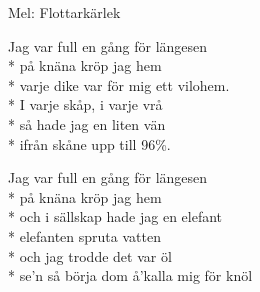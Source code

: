\begin{SongText}[Fyllerian]
    \begin{SongInfo}
        Mel: Flottarkärlek
    \end{SongInfo}
    \begin{SongVerse}
        Jag var full en gång för längesen\\*%
        på knäna kröp jag hem\\*%
        varje dike var för mig ett vilohem.\\*%
        I varje skåp, i varje vrå\\*%
        så hade jag en liten vän\\*%
        ifrån skåne upp till 96\%.
    \end{SongVerse}
    \begin{SongVerse}
        Jag var full en gång för längesen\\*%
        på knäna kröp jag hem\\*%
        och i sällskap hade jag en elefant\\*%
        elefanten spruta vatten\\*%
        och jag trodde det var öl\\*%
        se’n så börja dom å’kalla mig för knöl
    \end{SongVerse}
\end{SongText}
